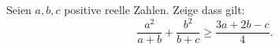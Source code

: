 Seien $a,b,c$ positive reelle Zahlen. Zeige dass gilt: 
\[
\frac{a^2}{a+b} + \frac{b^2}{b+c} \geq \frac{3a+2b-c}{4}.
\]